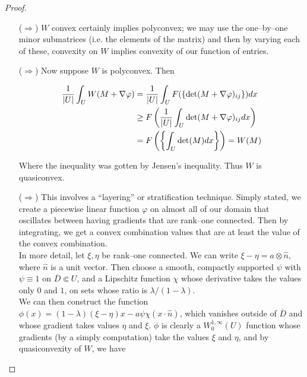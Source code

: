 \documentclass[../main.tex]{subfiles}
\begin{document}
\begin{proof}


	\begin{itemize}
		\item[($\Rightarrow$)]   $W$ convex certainly implies polyconvex; we may use the one--by--one minor submatrices (i.e. the elements of the matrix) and then by varying each of these, convexity on $W$ implies convexity of our function of entries.
		\item[($\Rightarrow$)] Now suppose $W$ is polyconvex.
			Then

			\begin{align*}
				\frac{1}{\lvert U\rvert} \int_U W(M + \nabla \varphi) & = \frac{1}{\lvert U\rvert} \int_U F( \{\mathrm{det}( M + \nabla \varphi)_{ij}\} ) dx         \\
				                                               & \geq F\left( \frac{1}{\lvert U\rvert} \int_U \mathrm{det} (M + \nabla \varphi)_{ij} dx \right) \\
				                                               & = F \left( \left\{ \int_U \mathrm{det} (M) dx \right\} \right) = W(M)
			\end{align*}

			Where the inequality was gotten by Jensen's inequality.
			Thus $W$ is quasiconvex.


		\item[($\Rightarrow$)] This involves a ``layering'' or stratification technique.
			Simply stated, we create a piecewise linear function $\varphi$ on almost all of our domain that oscillates between having gradients that are rank--one connected.
			Then by integrating, we get a convex combination values that are at least the value of the convex combination. \\

			In more detail, let $\xi, \eta$ be rank--one connected.
			We can write $\xi - \eta = a \otimes \widehat{n}$, where $\widehat{n}$ is a unit vector.
			Then choose a smooth, compactly supported $\psi$ with $\psi \equiv 1$ on $\overline{D} \Subset U$, and a Lipschitz function $\chi$ whose derivative takes the values only $0$ and $1$, on sets whose ratio is $\lambda/(1-\lambda)$. \\

			We can then construct the function $\phi(x) = (1 - \lambda) (\xi - \eta) x - a \psi \chi(x \cdot \widehat{n})$, which vanishes outside of $\overline{D}$ and whose gradient takes values $\eta$ and $\xi$.
			$\phi$ is clearly a $W^{1,\infty}_0(U)$ function whose gradients (by a simply computation) take the values $\xi$ and $\eta$, and by quasiconvexity of $W$, we have



\end{itemize}
\end{proof}
\end{document}
